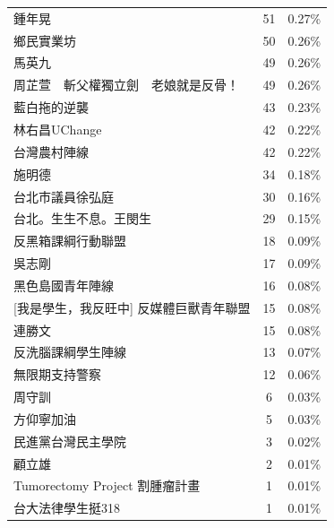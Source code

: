 \documentclass[a4paper, 10pt, conference]{ieeeconf}       %
\begin{document}
\begin{CJK}{UTF8}{bsmi}
\begin{longtable}[c]{@{}lcc@{}}
鍾年晃 & 51 & 0.27\% \\
鄉民實業坊 & 50 & 0.26\% \\
馬英九 & 49 & 0.26\% \\
周芷萱　斬父權獨立劍　老娘就是反骨！ & 49 & 0.26\% \\
藍白拖的逆襲 & 43 & 0.23\% \\
林右昌UChange & 42 & 0.22\% \\
台灣農村陣線 & 42 & 0.22\% \\
施明德 & 34 & 0.18\% \\
台北市議員徐弘庭 & 30 & 0.16\% \\
台北。生生不息。王閔生 & 29 & 0.15\% \\
反黑箱課綱行動聯盟 & 18 & 0.09\% \\
吳志剛 & 17 & 0.09\% \\
黑色島國青年陣線 & 16 & 0.08\% \\
{[}我是學生，我反旺中{]} 反媒體巨獸青年聯盟 & 15 & 0.08\% \\
連勝文 & 15 & 0.08\% \\
反洗腦課綱學生陣線 & 13 & 0.07\% \\
無限期支持警察 & 12 & 0.06\% \\
周守訓 & 6 & 0.03\% \\
方仰寧加油 & 5 & 0.03\% \\
民進黨台灣民主學院 & 3 & 0.02\% \\
顧立雄 & 2 & 0.01\% \\
Tumorectomy Project 割腫瘤計畫 & 1 & 0.01\% \\
台大法律學生挺318 & 1 & 0.01\% \\* \bottomrule
\end{longtable}


\end{CJK}
\end{document}
